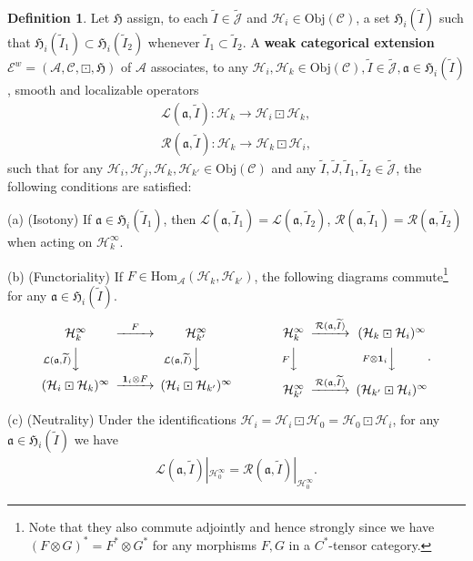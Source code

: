 \documentclass[12pt,a4paper]{article}
\theoremstyle{definition}
\newtheorem{df}{Definition}[subsection]
\theoremstyle{plain}
\newcommand{\fk}{\mathfrak}
\newcommand{\mc}{\mathcal}
\newcommand{\wtd}{\widetilde}
\newcommand{\id}{\mathbf{1}}
\newcommand{\Hom}{\mathrm{Hom}}
\newcommand{\scr}{\mathscr}
\newcommand{\Jtd}{\widetilde{\mathcal J}}
\newcommand{\Obj}{\mathrm{Obj}}
\numberwithin{equation}{subsection}
\begin{document}
\begin{df}\label{lb30}
Let $\fk H$ assign, to each $\wtd I\in\Jtd$ and $\mc H_i\in\Obj(\scr C)$, a set $\fk H_i(\wtd I)$  such that $\fk H_i(\wtd I_1)\subset\fk H_i(\wtd I_2)$  whenever $\wtd I_1\subset\wtd I_2$. A \textbf{weak categorical extension} $\scr E^w=(\mc A,\scr C,\boxdot,\fk H)$ of $\mc A$ associates, to any $\mc H_i,\mc H_k\in\Obj(\scr C),\wtd I\in\Jtd,\fk a\in\fk H_i(\wtd I)$, smooth and localizable operators
\begin{gather*}	
\mc L(\fk a,\wtd I):\mc H_k\rightarrow\mc H_i\boxdot\mc H_k,\\
\mc R(\fk a,\wtd I):\mc H_k\rightarrow\mc H_k\boxdot\mc H_i,
\end{gather*}
such that for any $\mc H_i,\mc H_j,\mc H_k,\mc H_{k'}\in\Obj(\scr C)$ and any $\wtd I,\wtd J,\wtd I_1,\wtd I_2\in\Jtd$, the following conditions are satisfied:

	(a) (Isotony) If  $\fk a\in\fk H_i(\wtd I_1)$, then $\mc L(\fk a,\wtd I_1)=\mc L(\fk a,\wtd I_2)$, $\mc R(\fk a,\wtd I_1)=\mc R(\fk a,\wtd I_2)$ when acting on $\mc H_k^\infty$.
	
	(b) (Functoriality) If  $F\in\Hom_{\mc A}(\mc H_k,\mc H_{k'})$,  the following diagrams commute\footnote{Note that they also commute adjointly and hence strongly since we have $(F\otimes G)^*=F^*\otimes G^*$ for any morphisms $F,G$ in a $C^*$-tensor category.}   for any $\fk a\in\fk H_i(\wtd I)$.
	\begin{gather}
	\begin{CD}
	\mc H_k^\infty @>F>> \mc H_{k'}^\infty\\
	@V \mc L(\fk a,\wtd I)  VV @V \mc L(\fk a,\wtd I)  VV\\
	(\mc H_i\boxdot\mc H_k)^\infty @> \id_i\otimes F>> (\mc H_i\boxdot\mc H_{k'})^\infty
	\end{CD}\qquad\qquad
	\begin{CD}
	\mc H_k^\infty @> \mc R(\fk a,\wtd I)  >> (\mc H_k\boxdot\mc H_i)^\infty\\
	@V F VV @V F\otimes\id_i  VV\\
	\mc H_{k'}^\infty @>\mc R(\fk a,\wtd I) >> (\mc H_{k'}\boxdot\mc H_i)^\infty
	\end{CD}.
	\end{gather}
	
	(c) (Neutrality) Under the identifications $\mc H_i=\mc H_i\boxdot\mc H_0=\mc H_0\boxdot\mc H_i$, for any $\fk a\in\fk H_i(\wtd I)$ we have
	\begin{align}
	\mc L(\fk a,\wtd I)|_{\mc H_0^\infty}=\mc R(\fk a,\wtd I)|_{\mc H_0^\infty}.	
	\end{align}
	

\end{df}
\end{document}

